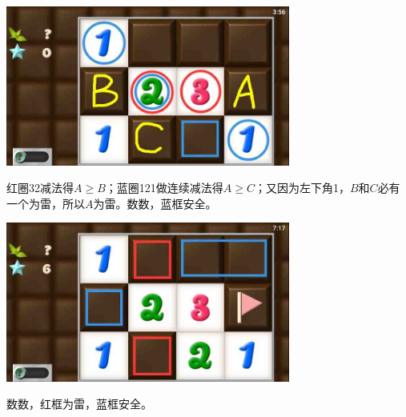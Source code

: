 \subsection{} %
\begin{center}
    \includegraphics[width=0.7\textwidth]{puzzlelow/40-1.jpg}
\end{center}
红圈32减法得$A\ge B$；蓝圈121做连续减法得$A\ge C$；又因为左下角1，$B$和$C$必有一个为雷，所以$A$为雷。数数，蓝框安全。
\begin{center}
    \includegraphics[width=0.7\textwidth]{puzzlelow/40-2.jpg}
\end{center}
数数，红框为雷，蓝框安全。


